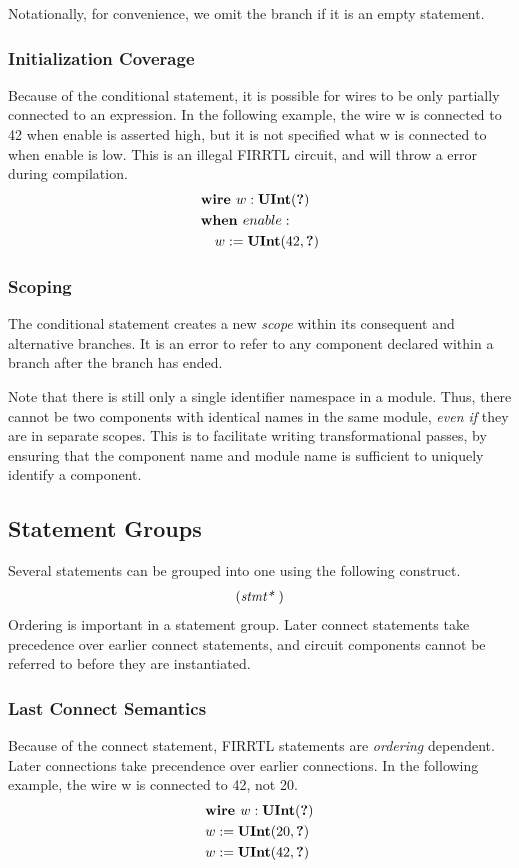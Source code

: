 \documentclass[12pt]{article}
\begin{document}
Notationally, for convenience, we omit the  branch if it is an empty statement. 

\subsubsection{Initialization Coverage}
Because of the conditional statement, it is possible for wires to be only partially connected to an expression.
In the following example, the wire w is connected to 42 when enable is asserted high, but it is not specified what w is connected to when enable is low.
This is an illegal FIRRTL circuit, and will throw a  error during compilation.
\[
\begin{aligned}
&\text{\bf wire\ } w : \text{\bf UInt}(\text{\bf ?}) \\
&\text{\bf when\ } enable : \\
&\quad w := \text{\bf UInt}(42, \text{\bf ?}) \\
\end{aligned}
\]

\subsubsection{Scoping}
The conditional statement creates a new {\em scope} within its consequent and alternative branches.
It is an error to refer to any component declared within a branch after the branch has ended.

Note that there is still only a single identifier namespace in a module.
Thus, there cannot be two components with identical names in the same module, {\em even if} they are in separate scopes.
This is to facilitate writing transformational passes, by ensuring that the component name and module name is sufficient to uniquely identify a component.

\subsection{Statement Groups}
Several statements can be grouped into one using the following construct.
\[
\begin{aligned}
(\text{\em stmt*\ })
\end{aligned}
\]
Ordering is important in a statement group.
Later connect statements take precedence over earlier connect statements, and circuit components cannot be referred to before they are instantiated.

\subsubsection{Last Connect Semantics}
Because of the connect statement, FIRRTL statements are {\em ordering} dependent.
Later connections take precendence over earlier connections.
In the following example, the wire w is connected to 42, not 20. 
\[
\begin{aligned}
&\text{\bf wire\ } w : \text{\bf UInt}(\text{\bf ?}) \\
&w := \text{\bf UInt}(20, \text{\bf ?}) \\
&w := \text{\bf UInt}(42, \text{\bf ?}) \\
\end{aligned}
\]
\end{document}
